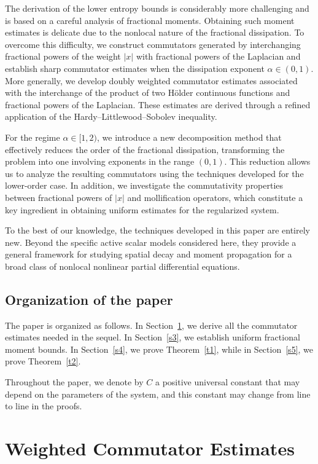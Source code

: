 \documentclass[12pt,reqno]{amsart}
\begin{document}
The derivation of the lower entropy bounds is considerably more challenging and is based on a careful analysis of fractional moments. Obtaining such moment estimates is delicate due to the nonlocal nature of the fractional dissipation. To overcome this difficulty, we construct commutators generated by interchanging fractional powers of the weight $|x|$ with fractional powers of the Laplacian and establish sharp commutator estimates when the dissipation exponent $\alpha\in(0,1)$. More generally, we develop doubly weighted commutator estimates associated with the interchange of the product of two H\"older continuous functions and fractional powers of the Laplacian. These estimates are derived through a refined application of the Hardy--Littlewood--Sobolev inequality.

For the regime $\alpha\in[1,2)$, we introduce a new decomposition method that effectively reduces the order of the fractional dissipation, transforming the problem into one involving exponents in the range $(0,1)$. This reduction allows us to analyze the resulting commutators using the techniques developed for the lower-order case. In addition, we investigate the commutativity properties between fractional powers of $|x|$ and mollification operators, which constitute a key ingredient in obtaining uniform estimates for the regularized system.

To the best of our knowledge, the techniques developed in this paper are entirely new. Beyond the specific active scalar models considered here, they provide a general framework for studying spatial decay and moment propagation for a broad class of nonlocal nonlinear partial differential equations.

\subsection{Organization of the paper} The paper is organized as follows. In Section~\ref{s2}, we derive all the commutator estimates needed in the sequel. In Section~\ref{s3}, we establish uniform fractional moment bounds. In Section~\ref{s4}, we prove Theorem~\ref{t1}, while in Section~\ref{s5}, we prove Theorem~\ref{t2}.

Throughout the paper, we denote by $C$ a positive universal constant that may depend on the parameters of the system, and this constant may change from line to line in the proofs. 



\section{Weighted Commutator Estimates} \label{s2}
\end{document}
